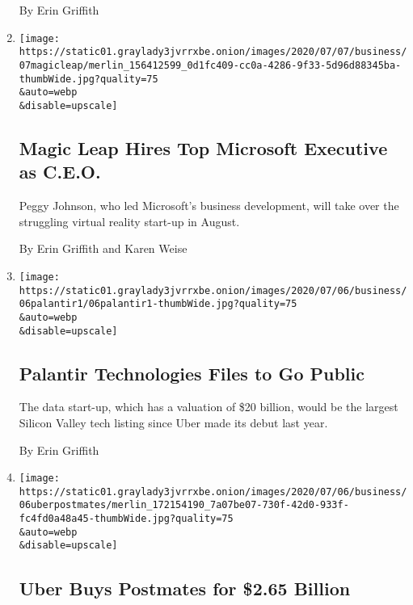 \begin{enumerate}
  By Erin Griffith
\item
  \href{/2020/07/07/technology/peggy-johnson-magic-leap-ceo.html}{}

  \texttt{[image: https://static01.graylady3jvrrxbe.onion/images/2020/07/07/business/07magicleap/merlin\_156412599\_0d1fc409-cc0a-4286-9f33-5d96d88345ba-thumbWide.jpg?quality=75\\\&auto=webp\\\&disable=upscale]}

  \hypertarget{magic-leap-hires-top-microsoft-executive-as-ceo}{%
  \subsection{Magic Leap Hires Top Microsoft Executive as
  C.E.O.}\label{magic-leap-hires-top-microsoft-executive-as-ceo}}

  Peggy Johnson, who led Microsoft's business development, will take
  over the struggling virtual reality start-up in August.

  By Erin Griffith and Karen Weise
\item
  \href{/2020/07/06/technology/palantir-technologies-ipo.html}{}

  \texttt{[image: https://static01.graylady3jvrrxbe.onion/images/2020/07/06/business/06palantir1/06palantir1-thumbWide.jpg?quality=75\\\&auto=webp\\\&disable=upscale]}

  \hypertarget{palantir-technologies-files-to-go-public}{%
  \subsection{Palantir Technologies Files to Go
  Public}\label{palantir-technologies-files-to-go-public}}

  The data start-up, which has a valuation of \$20 billion, would be the
  largest Silicon Valley tech listing since Uber made its debut last
  year.

  By Erin Griffith
\item
  \href{/2020/07/05/technology/uber-postmates-deal.html}{}

  \texttt{[image: https://static01.graylady3jvrrxbe.onion/images/2020/07/06/business/06uberpostmates/merlin\_172154190\_7a07be07-730f-42d0-933f-fc4fd0a48a45-thumbWide.jpg?quality=75\\\&auto=webp\\\&disable=upscale]}

  \hypertarget{uber-buys-postmates-for-265-billion}{%
  \subsection{Uber Buys Postmates for \$2.65
  Billion}\label{uber-buys-postmates-for-265-billion}}


\end{enumerate}

